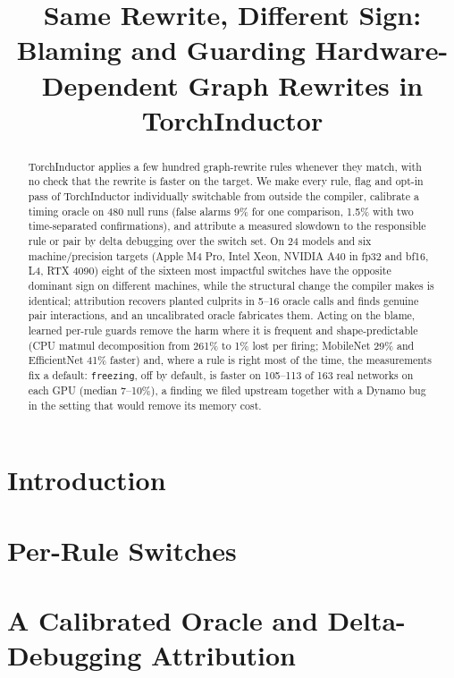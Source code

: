 \documentclass[conference]{IEEEtran}
\title{Same Rewrite, Different Sign:\\Blaming and Guarding Hardware-Dependent Graph Rewrites in TorchInductor}
\author{\IEEEauthorblockN{Anonymous Authors}\IEEEauthorblockA{Paper \#\_\_\_}}
\newcommand{\code}[1]{\texttt{#1}}
\begin{document}
\maketitle

\begin{abstract}
TorchInductor applies a few hundred graph-rewrite rules whenever they match, with no check that the rewrite is
faster on the target. We make every rule, flag and opt-in pass of TorchInductor individually switchable from
outside the compiler, calibrate a timing oracle on 480 null runs (false alarms 9\% for one comparison, 1.5\% with
two time-separated confirmations), and attribute a measured slowdown to the responsible rule or pair by delta
debugging over the switch set. On 24 models and six machine/precision targets (Apple M4 Pro, Intel Xeon, NVIDIA A40
in fp32 and bf16, L4, RTX 4090) eight of the sixteen most impactful switches have the opposite dominant sign on
different machines, while the structural change the compiler makes is identical; attribution recovers planted
culprits in 5--16 oracle calls and finds genuine pair interactions, and an uncalibrated oracle fabricates them.
Acting on the blame, learned per-rule guards remove the harm where it is frequent and shape-predictable (CPU matmul
decomposition from 261\% to 1\% lost per firing; MobileNet 29\% and EfficientNet 41\% faster) and, where a rule is
right most of the time, the measurements fix a default: \code{freezing}, off by default, is faster on 105--113 of 163
real networks on each GPU (median 7--10\%), a finding we filed upstream together with a Dynamo bug in the setting
that would remove its memory cost.
\end{abstract}

\section{Introduction}


\section{Per-Rule Switches}


\section{A Calibrated Oracle and Delta-Debugging Attribution}

\end{document}
